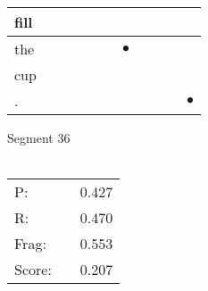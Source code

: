\documentclass[landscape]{article}
\newcommand{\ssp}{\hspace{2pt}}
\newcommand{\mex}{\cellcolor{g}$\bullet$}
\begin{document}
\begin{tabular}{|l|p{10pt}|p{10pt}|p{10pt}|p{10pt}|p{10pt}|p{10pt}|p{10pt}|p{10pt}|p{10pt}|p{10pt}|}
\hline
\ssp fill \ssp&\hspace{2pt}&\hspace{2pt}&\hspace{2pt}&\hspace{2pt}&\hspace{2pt}&\hspace{2pt}&\hspace{2pt}&\hspace{2pt}&\hspace{2pt}&\hspace{2pt}\\
\hline
\ssp \cellcolor{ref5}the \ssp&\hspace{2pt}&\hspace{2pt}&\hspace{2pt}&\hspace{2pt}&\hspace{2pt}&\hspace{2pt}\mex&\hspace{2pt}&\hspace{2pt}&\hspace{2pt}&\hspace{2pt}\\
\hline
\ssp cup \ssp&\hspace{2pt}&\hspace{2pt}&\hspace{2pt}&\hspace{2pt}&\hspace{2pt}&\hspace{2pt}&\hspace{2pt}&\hspace{2pt}&\hspace{2pt}&\hspace{2pt}\\
\hline
\ssp \cellcolor{ref9}. \ssp&\hspace{2pt}&\hspace{2pt}&\hspace{2pt}&\hspace{2pt}&\hspace{2pt}&\hspace{2pt}&\hspace{2pt}&\hspace{2pt}&\hspace{2pt}&\hspace{2pt}\mex\\
\hline
\end{tabular}

\vspace{6pt}
\noindent Segment 36\\\\
\noindent\begin{tabular}{lm{12pt}r}
\hline
P:&&0.427\\
R:&&0.470\\
Frag:&&0.553\\
Score:&&0.207\\
\end{tabular}
\end{document}
